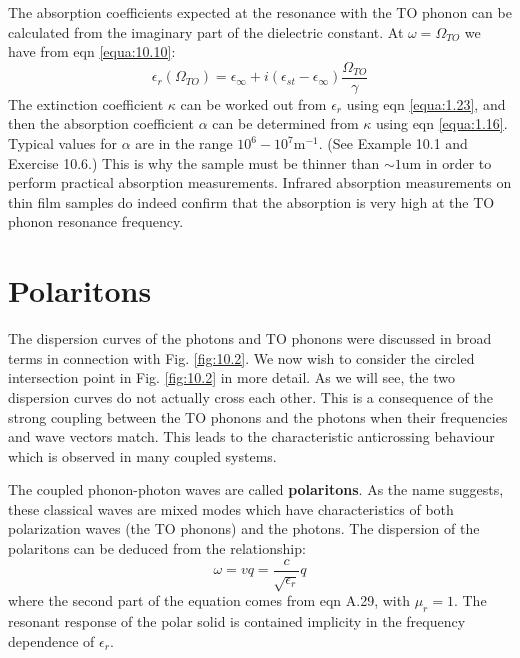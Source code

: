 \documentclass[12pt]{book}
\def\um{\mathrm{um}}
\begin{document}
{The absorption coefficients expected at the resonance with the TO phonon can be calculated from the imaginary part of the dielectric constant. At $\omega=\Omega_{TO}$ we have from eqn \ref{equa:10.10}:
\begin{equation}\label{equa:10.18}
  \epsilon_r(\Omega_{TO})=\epsilon_{\infty}+i(\epsilon_{st}-\epsilon_{\infty})\frac{\Omega_{TO}}{\gamma}
\end{equation}
The extinction coefficient $\kappa$ can be worked out from $\epsilon_r$ using eqn \ref{equa:1.23}, and then the absorption coefficient $\alpha$ can be determined from $\kappa$ using eqn \ref{equa:1.16}. Typical values for $\alpha$ are in the range $10^6-10^7\mathrm{m^{-1}}$. (See Example 10.1 and Exercise 10.6.) This is why the sample must be thinner than $\sim1\um$ in order to perform practical absorption measurements. Infrared absorption measurements on thin film samples do indeed confirm that the absorption is very high at the TO phonon resonance frequency.

\section{Polaritons}
The dispersion curves of the photons and TO phonons were discussed in broad terms in connection with Fig. \ref{fig:10.2}. We now wish to consider the circled intersection point in Fig. \ref{fig:10.2} in more detail. As we will see, the two dispersion curves do not actually cross each other. This is a consequence of the strong coupling between the TO phonons and the photons when their frequencies and wave vectors match. This leads to the characteristic anticrossing behaviour which is observed in many coupled systems.

The coupled phonon-photon waves are called \textbf{polaritons}. As the name suggests, these classical waves are mixed modes which have characteristics of both polarization waves (the TO phonons) and the photons. The dispersion of the polaritons can be deduced from the relationship:
\begin{equation}\label{equa:10.19}
  \omega=vq=\frac{c}{\sqrt{\epsilon_r}}q
\end{equation}
where the second part of the equation comes from eqn A.29, with $\mu_r = 1$. The resonant response of the polar solid is contained implicity in the frequency dependence of $\epsilon_r$.

}
\end{document}
